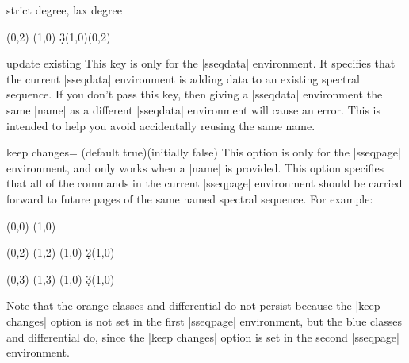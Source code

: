 \documentclass{ltxdoc}
\begin{document}
\begin{sseqdata}[name=ex1,degree={#1}{1-#1}]
\begin{keylist}{strict degree, lax degree}
\begin{codeexample}[]
\begin{sseqdata}[name=laxdegree,Adams grading, lax degree]
\class(0,2)
\class(1,0)
\d3(1,0)(0,2) %
\end{sseqdata}
\printpage[name=laxdegree,page=3]
\end{codeexample}
\end{keylist}

\begin{key}{update existing}
This key is only for the |sseqdata| environment. It specifies that the current |sseqdata| environment is adding data to an existing spectral sequence. If you don't pass this key, then giving a |sseqdata| environment the same |name| as a different |sseqdata| environment will cause an error. This is intended to help you avoid accidentally reusing the same name.
\end{key}


\begin{key}{keep changes= (default true)(initially false)}
This option is only for the |sseqpage| environment, and only works when a |name| is provided.
This option specifies that all of the commands in the current |sseqpage| environment should be carried forward to future pages of the same named spectral sequence. For example:
\begin{codeexample}[]
\begin{sseqdata}[name=keep changes example,Adams grading,y range={0}{3}]
\class(0,0)
\class(1,0)
\end{sseqdata}

\begin{sseqpage}[name=keep changes example,sseq=orange]
\class(0,2)
\class(1,2)
\classoptions[orange](1,0)
\d2(1,0)
\end{sseqpage}
%
\hskip1cm
%
\begin{sseqpage}[name=keep changes example,sseq=blue,keep changes]
\class(0,3)
\class(1,3)
\classoptions[blue](1,0)
\d3(1,0)
\end{sseqpage}
%
\hskip1cm
%
\printpage[name=keep changes example,page=3]
\end{codeexample}
Note that the orange classes and differential do not persist because the |keep changes| option is not set in the first |sseqpage| environment, but the blue classes and differential do, since the |keep changes| option is set in the second |sseqpage| environment.
\end{key}


\end{sseqdata}
\end{document}
